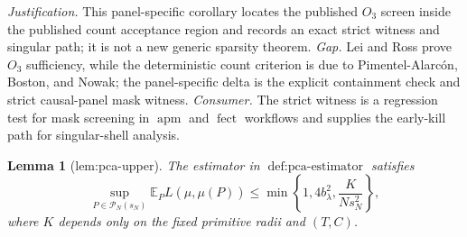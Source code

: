 \documentclass{article}
\newtheorem{lemma}{Lemma}
\begin{document}
\par\smallskip\noindent \textit{Justification.} This panel-specific corollary locates the published \(O_3\) screen inside the published count acceptance region and records an exact strict witness and singular path; it is not a new generic sparsity theorem. \textit{Gap.} Lei and Ross prove \(O_3\) sufficiency, while the deterministic count criterion is due to Pimentel-Alarcón, Boston, and Nowak; the panel-specific delta is the explicit containment check and strict causal-panel mask witness. \textit{Consumer.} The strict witness is a regression test for mask screening in \(\operatorname{apm}\) and \(\operatorname{fect}\) workflows and supplies the early-kill path for singular-shell analysis.

\begin{lemma}[lem:pca-upper]\label{lem:pca-upper}
The estimator in \(\operatorname{def:pca\text{-}estimator}\) satisfies
\[
\sup_{P\in\mathcal P_N(s_N)}
\mathbb E_P L(\widehat\mu,\mu(P))
\le \min\!\left\{1,4b_\lambda^2,\frac{K}{Ns_N^2}\right\},
\]
where \(K\) depends only on the fixed primitive radii and \((T,C)\).
\end{lemma}
\end{document}
